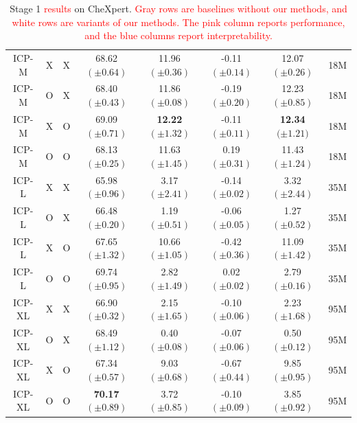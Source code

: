 \documentclass[preprint,7pt, a4paper]{elsarticle}
\begin{document}
\begin{table}
{\begin{tabular}{c|cc|c|ccc|c}
        \midrule
        ICP-M & X & X & 68.62 $(\pm0.64)$& 11.96 $(\pm0.36)$& -0.11 $(\pm0.14)$& 12.07 $(\pm0.26)$ & 18M\\
        ICP-M & O & X & 68.40 $(\pm0.43)$& 11.86 $(\pm0.08)$& -0.19 $(\pm0.20)$& 12.23 $(\pm0.85)$ & 18M\\
        \rowcolor{LemonChiffon1}
        ICP-M & X & O & 69.09 $(\pm0.71)$& \textbf{12.22} $\bm{(\pm1.32)}$& -0.11$(\pm0.11)$& \textbf{12.34 }$(\bm{\pm1.21)}$ & 18M\\
        ICP-M & O & O & 68.13 $ (\pm0.25)$& 11.63 $(\pm1.45)$& 0.19 $(\pm0.31)$& 11.43 $(\pm1.24)$ & 18M\\
        \midrule
        ICP-L & X & X & 65.98 $(\pm0.96)$& 3.17 $(\pm2.41)$& -0.14 $(\pm0.02)$& 3.32 $(\pm2.44)$ & 35M\\
        ICP-L & O & X & 66.48 $(\pm 0.20)$& 1.19 $(\pm0.51)$ & -0.06 $(\pm0.05)$ & 1.27 $(\pm0.52)$ & 35M\\
        ICP-L & X & O & 67.65 $(\pm1.32)$ & 10.66 $(\pm1.05)$ & -0.42 $(\pm0.36)$ & 11.09 $(\pm1.42)$ & 35M\\
        ICP-L & O & O & 69.74 $(\pm0.95)$& 2.82 $(\pm1.49)$ & 0.02 $(\pm0.02)$ & 2.79 $(\pm0.16)$ & 35M\\
        \midrule
        ICP-XL & X & X & 66.90 $(\pm0.32)$ & 2.15 $(\pm1.65)$& -0.10 $(\pm0.06)$& 2.23 $(\pm1.68)$ & 95M\\
        ICP-XL & O & X & 68.49 $(\pm1.12)$& 0.40 $(\pm0.08)$ & -0.07 $(\pm0.06)$ & 0.50 $(\pm0.12)$ & 95M\\
        ICP-XL & X & O & 67.34 $(\pm0.57)$ & 9.03 $(\pm0.68)$ & -0.67 $(\pm0.44)$ & 9.85 $(\pm0.95)$ & 95M\\
        ICP-XL & O & O & \textbf{70.17} $\bm{(\pm0.89)}$ & 3.72 $(\pm0.85)$ & -0.10 $(\pm0.09)$ & 3.85 $(\pm0.92)$ & 95M\\
        \bottomrule
    \end{tabular}}
    \caption{Stage 1 \textcolor{red}{results} on CheXpert. \textcolor{red}{Gray rows are baselines without our methods, and white rows are variants of our methods. The pink column reports performance, and the blue columns report interpretability.}}
    \label{tab:2}
\end{table}

\end{document}
